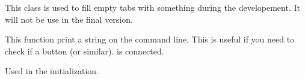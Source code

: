 \documentclass[letterpaper,10pt,english]{sphinxmanual}
\begin{document}
\begin{fulllineitems}
\label{\detokenize{index:src_GUI.Main_windows_1.EmptyTab}}
This class is  used to fill empty tabs with something during the developement.
It will not be use in the final version.

\begin{fulllineitems}
\label{\detokenize{index:src_GUI.Main_windows_1.EmptyTab.addtext}}
This function print a string on the command line. This is useful if you need to check if a button (or similar).
is connected.

\end{fulllineitems}


\begin{fulllineitems}
\label{\detokenize{index:src_GUI.Main_windows_1.EmptyTab.init_iu}}
Used in the initialization.

\end{fulllineitems}


\end{fulllineitems}

\end{document}
